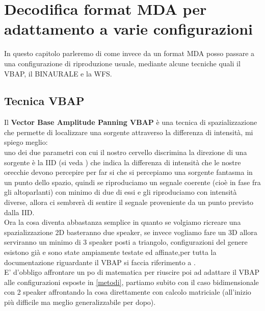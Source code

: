 \documentclass[12pt,a4paper]{report}
\begin{document}
\chapter{Decodifica format MDA per adattamento a varie configurazioni}

In questo capitolo parleremo di come invece da un format MDA posso passare a una configurazione di riproduzione usuale, mediante alcune tecniche quali il VBAP, il BINAURALE e la WFS.\\

\section{Tecnica VBAP}

Il \textbf{Vector Base Amplitude Panning VBAP} è una tecnica di spazializzazione che permette di localizzare una sorgente attraverso la differenza di intensità, mi spiego meglio:\\
uno dei due parametri con cui il nostro cervello discrimina la direzione di una sorgente è la IID (si veda \cite{iid}) che indica la differenza di intensità che le nostre orecchie devono percepire per far si che si percepiamo una sorgente fantasma in un punto dello spazio, quindi se riproduciamo un segnale coerente (cioè in fase fra gli altoparlanti) con minimo di due di essi e gli riproduciamo con intensità diverse, allora ci sembrerà di sentire il segnale proveniente da un punto previsto dalla IID.\\

Ora la cosa diventa abbastanza semplice in quanto se volgiamo ricreare una spazializzazione 2D basteranno due speaker, se invece vogliamo fare un 3D allora serviranno un minimo di 3 speaker posti a triangolo, configurazioni del genere esistono già e sono state ampiamente testate ed affinate,per tutta la documentazione riguardante il VBAP si faccia riferimento a \cite{vbap}.\\

E' d'obbligo affrontare un po di matematica per riuscire poi ad adattare il VBAP alle configurazioni esposte in \ref{metodi}, partiamo subito con il caso bidimensionale con 2 speaker affrontando la cosa direttamente con calcolo matriciale (all'inizio più difficile ma meglio generalizzabile per dopo).\\
\end{document}
